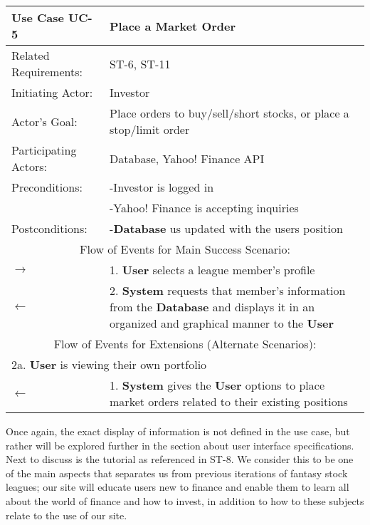 \begin{centering}
\label{UC-5}
\renewcommand\arraystretch{1.3}
\begin{longtable}{|p{1.2in} p{5in}|}
\hline
\bfseries{\color{color1}Use Case UC-5} &
\bfseries{\color{color1}Place a Market Order} \\
\hline
Related Requirements: & ST-6, ST-11 \\
Initiating Actor:     & Investor \\
Actor's Goal:         & Place orders to buy/sell/short stocks, or place a stop/limit order \\
Participating Actors: & Database, Yahoo! Finance API \\
Preconditions:        & -Investor is logged in \\
                      & -Yahoo! Finance is accepting inquiries \\
Postconditions:       & -\textbf{Database} us updated with the users position \\
\hline
\multicolumn{2}{|c|}{\color{color1}Flow of Events for Main Success Scenario:}\\
\hline
$\rightarrow$ & 1. \textbf{User} selects a league member's profile \\
$\leftarrow$ & 2. \textbf{System} requests that member's information from the \textbf{Database} and displays it in an organized and graphical manner to the \textbf{User} \\
\hline
\multicolumn{2}{|c|}{\color{color1}Flow of Events for Extensions (Alternate Scenarios):} \\
\hline
\multicolumn{2}{|p{6.2in}|}{2a. \textbf{User} is viewing their own portfolio} \\
\hline
$\leftarrow$ & 1. \textbf{System} gives the \textbf{User} options to place market orders related to their existing positions \\
\hline
\end{longtable}
\end{centering}

Once again, the exact display of information is not defined in the use case, but rather
will be explored further in the section about user interface specifications. Next to
discuss is the tutorial as referenced in ST-8. We consider this to be one of the main
aspects that separates us from previous iterations of fantasy stock leagues; our site will
educate users new to finance and enable them to learn all about the world of finance and
how to invest, in addition to how to these subjects relate to the use of our site.\\

